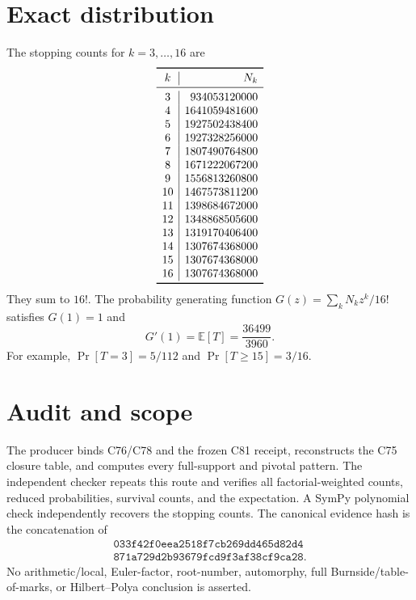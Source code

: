 \documentclass[10pt]{article}
\begin{document}
\section{Exact distribution}
The stopping counts for $k=3,\ldots,16$ are
\[
\begin{array}{c|r}
\toprule
k&N_k\\\midrule
3&934053120000\\
4&1641059481600\\
5&1927502438400\\
6&1927328256000\\
7&1807490764800\\
8&1671222067200\\
9&1556813260800\\
10&1467573811200\\
11&1398684672000\\
12&1348868505600\\
13&1319170406400\\
14&1307674368000\\
15&1307674368000\\
16&1307674368000\\
\bottomrule
\end{array}
\]
They sum to $16!$.  The probability generating function
$G(z)=\sum_kN_kz^k/16!$ satisfies $G(1)=1$ and
\[
 G'(1)=\mathbb E[T]=\frac{36499}{3960}.
\]
For example, $\Pr[T=3]=5/112$ and $\Pr[T\geq15]=3/16$.

\section{Audit and scope}
The producer binds C76/C78 and the frozen C81 receipt, reconstructs the C75
closure table, and computes every full-support and pivotal pattern.  The
independent checker repeats this route and verifies all factorial-weighted
counts, reduced probabilities, survival counts, and the expectation.  A
SymPy polynomial check independently recovers the stopping counts.  The
canonical evidence hash is the concatenation of
\[
\begin{gathered}
\texttt{033f42f0eea2518f7cb269dd465d82d4}\\[-2pt]
\texttt{871a729d2b93679fcd9f3af38cf9ca28}.
\end{gathered}
\]
No arithmetic/local, Euler-factor, root-number, automorphy, full
Burnside/table-of-marks, or Hilbert--Polya conclusion is asserted.
\end{document}
